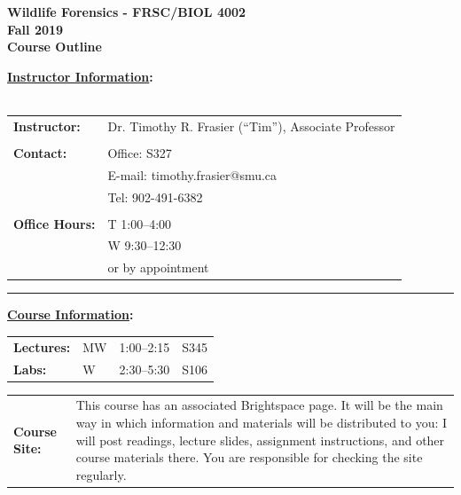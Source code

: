 \documentclass[hidelinks]{article}
\begin{document}
\vspace*{0.01cm}

\begin{center}
	\Large{\textbf{Wildlife Forensics - FRSC/BIOL 4002\\
	Fall 2019\\
	Course Outline}}
\end{center}


\textbf{\underline{Instructor Information}:}\\
\\
	\begin{tabular}{@{} p{2.3cm} l }
		\textbf{Instructor:}	& Dr. Timothy R. Frasier (``Tim''), Associate Professor\\
		\\
		\textbf{Contact:} 	& Office: S327\\
					& E-mail: timothy.frasier@smu.ca\\
					& Tel: 902-491-6382\\
		\\
		\textbf{Office Hours:} & T 1:00--4:00\\
			& W 9:30--12:30\\
			& or by appointment				
	\end{tabular}

	\begin{center}
		\rule{4cm}{0.5pt}
	\end{center}


\textbf{\underline{Course Information}:}


	\begin{tabular}{@{} p{2.3cm} l l l}
		\textbf{Lectures:} & MW & 1:00--2:15 & S345\\
		\textbf{Labs:} & W & 2:30--5:30 & S106\\
	\end{tabular}
	
	
	\begin{tabular}{@{} p{2.3cm} p{13.9cm}}
		\textbf{Course Site:} & This course has an associated Brightspace page. It will be the main way in which information and materials will be distributed to you: I will post readings, lecture slides, assignment instructions, and other course materials there. You are responsible for checking the site regularly.\\
	\end{tabular}
\end{document}
